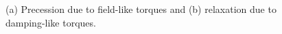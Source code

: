 \begin{figure}
\centering
{}%
\hspace{0.31\textwidth}
%
\caption{Caption}\caption{(a) Precession due to field-like torques and (b) relaxation due to damping-like torques. }
\end{figure}

